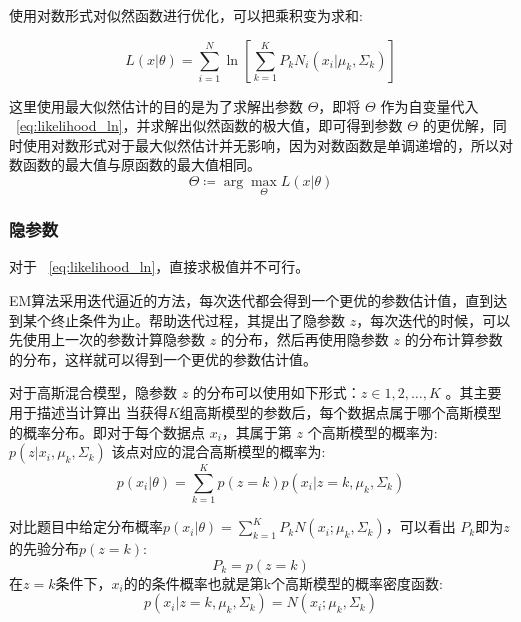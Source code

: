 \documentclass[UTF8]{article} %
\begin{document}
    使用对数形式对似然函数进行优化，可以把乘积变为求和:

    \begin{equation}
        L(x|\theta) = \sum_{i=1}^N \ln \left[ \sum_{k=1}^K P_k N_i(x_i|\mu_k, \Sigma_k) \right] \label{eq:likelihood_ln}
    \end{equation}

    这里使用最大似然估计的目的是为了求解出参数 $\Theta$，即将 $\Theta$ 作为自变量代入 ~\eqref{eq:likelihood_ln}，并求解出似然函数的极大值，即可得到参数 $\Theta$ 的更优解，同时使用对数形式对于最大似然估计并无影响，因为对数函数是单调递增的，所以对数函数的最大值与原函数的最大值相同。
    \begin{equation}
        \Theta \coloneqq \arg\max_{\Theta} L(x|\theta) \label{eq:likelihood_max}
    \end{equation}

    \subsubsection{隐参数}
    对于 ~\eqref{eq:likelihood_ln}，直接求极值并不可行。

    EM算法采用迭代逼近的方法，每次迭代都会得到一个更优的参数估计值，直到达到某个终止条件为止。帮助迭代过程，其提出了隐参数 $z$，每次迭代的时候，可以先使用上一次的参数计算隐参数 $z$ 的分布，然后再使用隐参数 $z$ 的分布计算参数的分布，这样就可以得到一个更优的参数估计值。

    对于高斯混合模型，隐参数 $z$ 的分布可以使用如下形式：$z \in 1,2,\dots,K$ 。其主要用于描述当计算出 当获得$K$组高斯模型的参数后，每个数据点属于哪个高斯模型的概率分布。即对于每个数据点 $x_i$，其属于第 $z$ 个高斯模型的概率为:
    $p(z|x_i,\mu_k,\Sigma_k)$
    该点对应的混合高斯模型的概率为:
    \begin{equation}
        p(x_i|\theta) = \sum_{k=1}^K p(z=k) p(x_i|z=k,\mu_k,\Sigma_k) \label{eq:z_gaussian_mixture}
    \end{equation}

    对比题目中给定分布概率$p(x_i|\theta) = \sum_{k=1}^K P_k N(x_i;\mu_k, \Sigma_k)$，可以看出 $P_k$即为$z$的先验分布$p(z=k)$:
    \begin{equation}
        P_k = p(z=k) \label{eq:z_prior}
    \end{equation}
    在$z=k$条件下，$x_i$的的条件概率也就是第k个高斯模型的概率密度函数:
    \begin{equation}
        p(x_i|z=k,\mu_k,\Sigma_k) = N(x_i;\mu_k, \Sigma_k) \label{eq:z_conditional}
    \end{equation}
\end{document}

